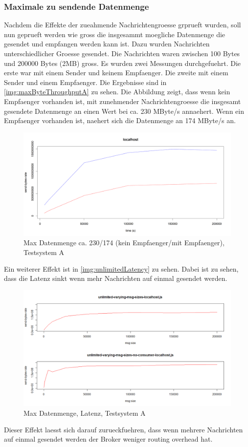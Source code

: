 \subsubsection{Maximale zu sendende Datenmenge}
\label{sec:maxthroughput}
Nachdem die Effekte der zueahmende Nachrichtengroesse grprueft wurden, soll nun geprueft werden wie gross die insgesammt moegliche Datenmenge die gesendet und empfangen werden kann ist. Dazu wurden Nachrichten unterschiedlicher Groesse gesendet. Die Nachrichten waren zwischen 100 Bytes und 200000 Bytes (2MB) gross. Es wurden zwei Messungen durchgefuehrt. Die erste war mit einem Sender und keinem Empfaenger. Die zweite mit einem Sender und einem Empfaenger. 
Die Ergebnisse sind in \autoref{img:maxByteThroughputA} zu sehen. Die Abbildung zeigt, dass wenn kein Empfaenger vorhanden ist, mit zunehmender Nachrichtengroesse die insgesamt gesendete Datenmenge an einen Wert bei ca. 230 MByte/s annaehert. Wenn ein Empfaenger vorhanden ist, naehert sich die Datenmenge an 174 MByte/s an.
\begin{figure}
\center
  \includegraphics[width=1\textwidth]{images/measurement/rate-limit-unlimited-consumer-vs-no-consumer.png}
  \caption{Max Datenmenge ca. 230/174 (kein Empfaenger/mit Empfaenger), Testsystem A}
  \label{img:maxByteThroughputA}
\end{figure}

Ein weiterer Effekt ist in \autoref{img:unlimitedLatency} zu sehen. Dabei ist zu sehen, dass die Latenz sinkt wenn mehr Nachrichten auf einmal gesendet werden.
\begin{figure}
\center
  \includegraphics[width=1\textwidth]{images/max-byte-throughput-A.png}
  \caption{Max Datenmenge, Latenz, Testsystem A}
  \label{img:unlimitedLatency}
\end{figure}
Dieser Effekt laesst sich darauf zurueckfuehren, dass wenn mehrere Nachrichten auf einmal gesendet werden der Broker weniger routing overhead hat.

